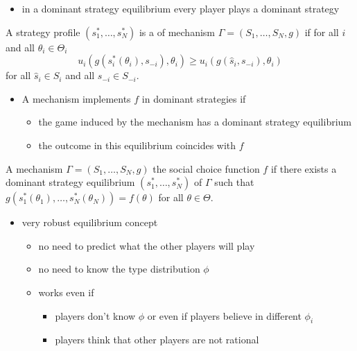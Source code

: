\documentclass[english,handout,10pt]{beamer}		%
\def\lyxframeend{} %
\begin{document}
\begin{itemize}
	\item in a dominant strategy equilibrium every player plays a dominant strategy
\end{itemize}
\begin{definition}
	A strategy profile $(s_1^*,\dots,s_N^*)$ is a  of mechanism  $\Gamma=(S_{1},\dots,S_{N},g)$ if for all $i$ and all $\theta_{i}\in \Theta_{i}$
	$$ u_{i}(g(s_{i}^{*}(\theta_{i}),s_{-i}),\theta_{i})\geq u_{i}(g(\hat s_{i},s_{-i}),\theta_{i})$$
	for all $\hat s_{i}\in S_{i}$ and all $s_{-i}\in S_{-i}$.
\end{definition}
\lyxframeend


\begin{itemize}
	\item A mechanism implements $f$ in dominant strategies if
	\begin{itemize}
		\item the game induced by the mechanism has a dominant strategy equilibrium
		\item the outcome in this equilibrium coincides with $f$
	\end{itemize}
\end{itemize}
\begin{definition}
	A mechanism $\Gamma=(S_{1},\dots,S_{N},g)$  the social choice function $f$  if there exists a dominant strategy equilibrium $(s_1^*,\dots,s_N^*)$ of $\Gamma$ such that $g(s_1^*(\theta_{1}),\dots,s_N^*(\theta_{N}))=f(\theta)$ for all $\theta\in\Theta$.
\end{definition}
\lyxframeend


\begin{itemize}
	\item very robust equilibrium concept
	\begin{itemize}
		\item no need to predict what the other players will play
		\item no need to know the type distribution $\phi$
		\item works even if
		\begin{itemize}
			\item players don't know $\phi$ or even if players believe in different $\phi_{i}$
			\item players think that other players are not rational
		\end{itemize}
	\end{itemize}
\end{itemize}
\lyxframeend
\end{document}
